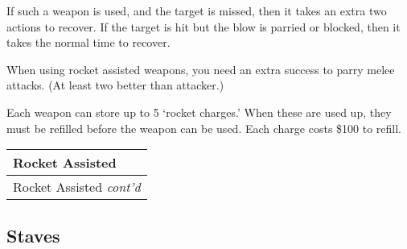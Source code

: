 \documentclass[twoside]{book}
\begin{document}
    {  
      If such a weapon is used, and the target is missed,
               then it takes an extra two actions to recover. If the
               target is hit but the blow is parried or blocked, then it
               takes the normal time to recover. 
    }
  
    {  
      When using rocket assisted weapons, you need an
               extra success to parry melee attacks. (At least two better
               than attacker.) 
    }
  
    {  
      Each weapon can store up to 5 `rocket
               charges.' When these are used up, they must be
               refilled before the weapon can be used. Each charge costs
               \$100 to refill. 
    }
  
\begin{longtable}{p{1.25in}} 
  Rocket Assisted
  \\
  \hline
  \hline
  \endfirsthead
  Rocket Assisted \textit{cont'd}
        
  \\
  \hline
  \endhead
      
\end{longtable}
    
\begin{multicols}{2}
    
\end{multicols}
  
    

\subsection{Staves}
    
\end{document}
